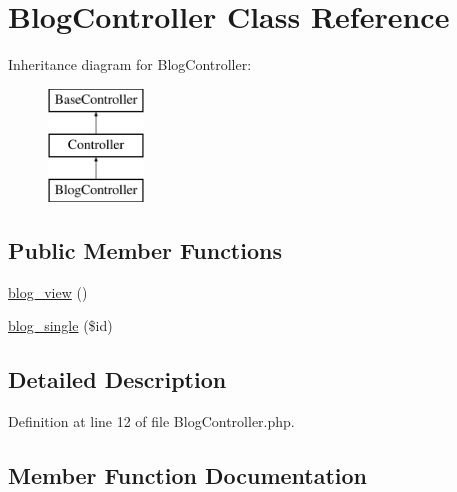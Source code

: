 \hypertarget{class_responsive_1_1_http_1_1_controllers_1_1_blog_controller}{}\section{Blog\+Controller Class Reference}
\label{class_responsive_1_1_http_1_1_controllers_1_1_blog_controller}
Inheritance diagram for Blog\+Controller\+:\begin{figure}[H]
\begin{center}
\leavevmode
\includegraphics[height=3.000000cm]{class_responsive_1_1_http_1_1_controllers_1_1_blog_controller}
\end{center}
\end{figure}
\subsection*{Public Member Functions}
\begin{DoxyCompactItemize}
\item 
\mbox{\hyperlink{class_responsive_1_1_http_1_1_controllers_1_1_blog_controller_a358452728e6fd2f68f038c7ab24c63b6}{blog\+\_\+view}} ()
\item 
\mbox{\hyperlink{class_responsive_1_1_http_1_1_controllers_1_1_blog_controller_a06a2269e5786f9c6fdadb099d3f2d31b}{blog\+\_\+single}} (\$id)
\end{DoxyCompactItemize}


\subsection{Detailed Description}


Definition at line 12 of file Blog\+Controller.\+php.



\subsection{Member Function Documentation}
\mbox{\label{class_responsive_1_1_http_1_1_controllers_1_1_blog_controller_a06a2269e5786f9c6fdadb099d3f2d31b}} 

